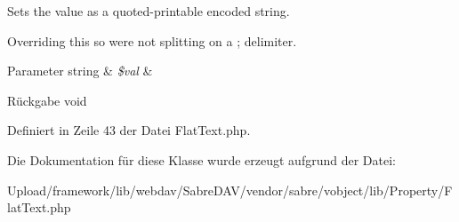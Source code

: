 Sets the value as a quoted-\/printable encoded string.

Overriding this so we\textquotesingle{}re not splitting on a ; delimiter.


\begin{DoxyParams}[1]{Parameter}
string & {\em \$val} & \\
\hline
\end{DoxyParams}
\begin{DoxyReturn}{Rückgabe}
void 
\end{DoxyReturn}


Definiert in Zeile 43 der Datei Flat\+Text.\+php.



Die Dokumentation für diese Klasse wurde erzeugt aufgrund der Datei\+:\begin{DoxyCompactItemize}
\item 
Upload/framework/lib/webdav/\+Sabre\+D\+A\+V/vendor/sabre/vobject/lib/\+Property/Flat\+Text.\+php\end{DoxyCompactItemize}
